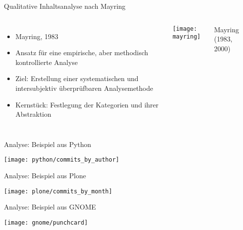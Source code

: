 \documentclass[11pt]{beamer}
\newlength{\colwidth}
\begin{document}
\begin{frame}[t]{Qualitative Inhaltsanalyse nach Mayring}
  \begin{columns}[T]
  \column{\colwidth}
    \begin{itemize}
      \item Mayring, 1983
      \item Ansatz für eine empirische, aber methodisch kontrollierte Analyse
      \item Ziel: Erstellung einer systematischen und intersubjektiv überprüfbaren Analysemethode
      \item Kernstück: Festlegung der Kategorien und ihrer Abstraktion
    \end{itemize}
  \column{\colwidth}
    \texttt{[image: mayring]}

    {\tiny\hfill
    Mayring (1983, 2000)
    }
  \end{columns}
\end{frame}

\begin{frame}{Analyse: Beispiel aus Python}
  \begin{center}
    \texttt{[image: python/commits\_by\_author]}
  \end{center}
\end{frame}

\begin{frame}{Analyse: Beispiel aus Plone}
  \begin{center}
    \texttt{[image: plone/commits\_by\_month]}
  \end{center}
\end{frame}

\begin{frame}{Analyse: Beispiel aus GNOME}
  \begin{center}
    \texttt{[image: gnome/punchcard]}
  \end{center}
\end{frame}
\end{document}
